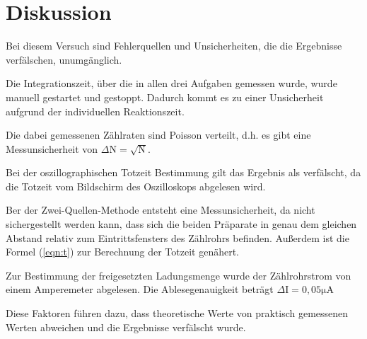 \section{Diskussion}
\newpage
Bei diesem Versuch sind Fehlerquellen und Unsicherheiten, die die Ergebnisse verfälschen, unumgänglich.

\noindent
Die Integrationszeit, über die in allen drei Aufgaben gemessen wurde, wurde manuell gestartet und gestoppt.
Dadurch kommt es zu einer Unsicherheit aufgrund der individuellen Reaktionszeit.

\noindent
Die dabei gemessenen Zählraten sind Poisson verteilt, d.h. es gibt eine Messunsicherheit von $\Delta\text{N}=\sqrt{\text{N}}$.

\noindent
Bei der oszillographischen Totzeit Bestimmung gilt das Ergebnis als verfälscht, da die Totzeit vom Bildschirm des Oszilloskops abgelesen wird.

\noindent
Ber der Zwei-Quellen-Methode entsteht eine Messunsicherheit, da nicht sichergestellt werden kann, dass sich die beiden Präparate in genau dem gleichen Abstand relativ zum Eintrittsfensters des Zählrohrs befinden.
Außerdem ist die Formel (\ref{eqn:t}) zur Berechnung der Totzeit genähert.

\noindent
Zur Bestimmung der freigesetzten Ladungsmenge wurde der Zählrohrstrom von einem Amperemeter abgelesen.
Die Ablesegenauigkeit beträgt $\Delta\text{I}=0,05\si{\micro\ampere}$

\noindent
Diese Faktoren führen dazu, dass theoretische Werte von praktisch gemessenen Werten abweichen und die Ergebnisse verfälscht wurde.


